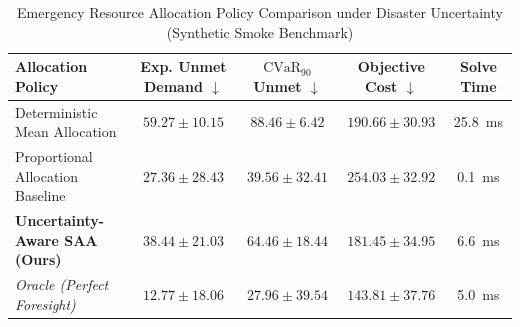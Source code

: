 \begin{table}[h]
\centering
\caption{Emergency Resource Allocation Policy Comparison under Disaster Uncertainty (Synthetic Smoke Benchmark)}
\label{tab:allocation}
\begin{tabular}{lcccc}
\toprule
Allocation Policy & Exp. Unmet Demand $\downarrow$ & $\text{CVaR}_{90}$ Unmet $\downarrow$ & Objective Cost $\downarrow$ & Solve Time \\
\midrule
Deterministic Mean Allocation & $59.27 \pm 10.15$ & $88.46 \pm 6.42$ & $190.66 \pm 30.93$ & 25.8~ms \\
Proportional Allocation Baseline & $27.36 \pm 28.43$ & $39.56 \pm 32.41$ & $254.03 \pm 32.92$ & 0.1~ms \\
\textbf{Uncertainty-Aware SAA (Ours)} & $38.44 \pm 21.03$ & $64.46 \pm 18.44$ & $181.45 \pm 34.95$ & 6.6~ms \\
\textit{Oracle (Perfect Foresight)} & $12.77 \pm 18.06$ & $27.96 \pm 39.54$ & $143.81 \pm 37.76$ & 5.0~ms \\
\bottomrule
\end{tabular}
\end{table}